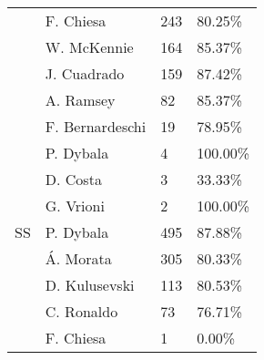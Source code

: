 \begin{table}[!htbp]
\begin{tabular}{@{}llll@{}}
               & F. Chiesa         & 243         & 80.25\%  \\
               & W. McKennie       & 164         & 85.37\%  \\
              & J. Cuadrado       & 159         & 87.42\%  \\
              & A. Ramsey         & 82          & 85.37\%  \\
              & F. Bernardeschi   & 19          & 78.95\%  \\
              & P. Dybala         & 4           & 100.00\% \\
             & D. Costa     & 3           & 33.33\%  \\
                   & G. Vrioni         & 2           & 100.00\% \\
SS               & P. Dybala         & 495         & 87.88\%  \\
               & Á. Morata     & 305         & 80.33\%  \\
               & D. Kulusevski     & 113         & 80.53\%  \\
               & C. Ronaldo & 73          & 76.71\%  \\
               & F. Chiesa         & 1           & 0.00\%   \\ \bottomrule
\end{tabular}

\label{tab:juventus_position_comp}
\end{table}
